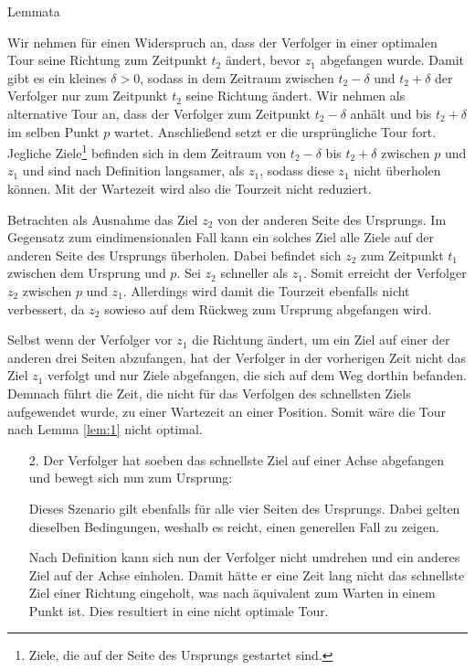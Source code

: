 \documentclass[10pt,table,xcolor=dvipsnames]{beamer}
\begin{document}
\begin{frame}{Lemmata}
\begin{itemize}
Wir nehmen für einen Widerspruch an, dass der Verfolger in einer optimalen Tour seine Richtung zum Zeitpunkt $t_2$ ändert, bevor $z_1$ abgefangen wurde. Damit gibt es ein kleines $\delta>0$, sodass in dem Zeitraum zwischen $t_2-\delta$ und $t_2+\delta$ der Verfolger nur zum Zeitpunkt $t_2$ seine Richtung ändert. Wir nehmen als alternative Tour an, dass der Verfolger zum Zeitpunkt $t_2-\delta$ anhält und bis $t_2+\delta$ im selben Punkt $p$ wartet. Anschließend setzt er die ursprüngliche Tour fort. Jegliche Ziele\footnote{Ziele, die auf der Seite des Ursprungs gestartet sind.} befinden sich in dem Zeitraum von $t_2-\delta$ bis $t_2+\delta$ zwischen $p$ und $z_1$ und sind nach Definition langsamer, als $z_1$, sodass diese $z_1$ nicht überholen können. Mit der Wartezeit wird also die Tourzeit nicht reduziert.

Betrachten als Ausnahme das Ziel $z_2$ von der anderen Seite des Ursprungs. Im Gegensatz zum eindimensionalen Fall kann ein solches Ziel alle Ziele auf der anderen Seite des Ursprungs überholen. Dabei befindet sich  $z_2$ zum Zeitpunkt $t_1$ zwischen dem Ursprung und $p$. Sei $z_2$ schneller als $z_1$. Somit erreicht der Verfolger $z_2$ zwischen $p$ und $z_1$. Allerdings wird damit die Tourzeit ebenfalls nicht verbessert, da $z_2$ sowieso auf dem Rückweg zum Ursprung abgefangen wird. 

Selbst wenn der Verfolger vor $z_1$ die Richtung ändert, um ein Ziel auf einer der anderen drei Seiten abzufangen, hat der Verfolger in der vorherigen Zeit nicht das Ziel $z_1$ verfolgt und nur Ziele abgefangen, die sich auf dem Weg dorthin befanden. Demnach führt die Zeit, die nicht für das Verfolgen des schnellsten Ziels aufgewendet wurde, zu einer Wartezeit an einer Position. Somit wäre die Tour nach Lemma \ref{lem:1} nicht optimal.
\end{itemize}

\framebreak

\begin{itemize}
\item[2.]
Der Verfolger hat soeben das schnellste Ziel auf einer Achse abgefangen und bewegt sich nun zum Ursprung:

Dieses Szenario gilt ebenfalls für alle vier Seiten des Ursprungs. Dabei gelten dieselben Bedingungen, weshalb es reicht, einen generellen Fall zu zeigen. 

Nach Definition kann sich nun der Verfolger nicht umdrehen und ein anderes Ziel auf der Achse einholen. Damit hätte er eine Zeit lang nicht das schnellste Ziel einer Richtung eingeholt, was  nach \cite{helvig} äquivalent zum Warten in einem Punkt ist. Dies resultiert in eine nicht optimale Tour.


\end{itemize}
\end{frame}
\end{document}
